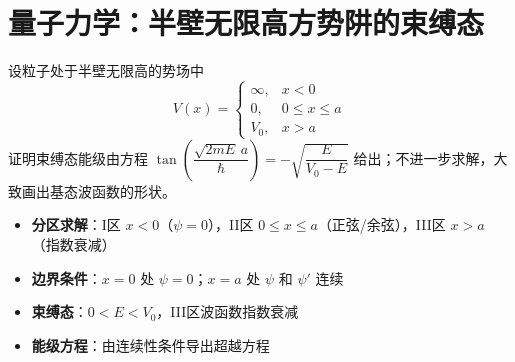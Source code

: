 \section{量子力学：半壁无限高方势阱的束缚态}
\label{sec:half-infinite-well}

\begin{modelbox}[题目：半壁无限高方势阱的能级与波函数]
设粒子处于半壁无限高的势场中
\[
V(x)=\begin{cases}\infty,&x<0\\0,&0\leq x\leq a\\V_0,&x>a\end{cases}
\]
证明束缚态能级由方程 $\tan\left(\dfrac{\sqrt{2mE}\,a}{\hbar}\right)=-\sqrt{\dfrac{E}{V_0-E}}$ 给出；不进一步求解，大致画出基态波函数的形状。
\end{modelbox}

\begin{tipbox}[考点快速分析]
\begin{itemize}
    \item \textbf{分区求解}：I区 $x<0$（$\psi=0$），II区 $0\leq x\leq a$（正弦/余弦），III区 $x>a$（指数衰减）
    \item \textbf{边界条件}：$x=0$ 处 $\psi=0$；$x=a$ 处 $\psi$ 和 $\psi'$ 连续
    \item \textbf{束缚态}：$0<E<V_0$，III区波函数指数衰减
    \item \textbf{能级方程}：由连续性条件导出超越方程
\end{itemize}
\end{tipbox}

